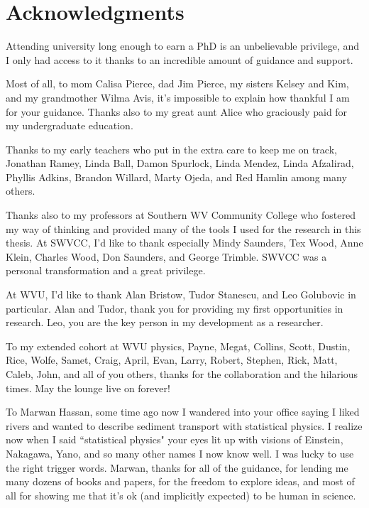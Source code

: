 
\chapter{Acknowledgments}

Attending university long enough to earn a PhD is an unbelievable privilege, and I only had access to it thanks to an incredible amount of guidance and support.

Most of all, to mom Calisa Pierce, dad Jim Pierce, my sisters Kelsey and Kim, and my grandmother Wilma Avis, it's impossible to explain how thankful I am for your guidance. Thanks also to my great aunt Alice who graciously paid for my undergraduate education.

Thanks to my early teachers who put in the extra care to keep me on track, Jonathan Ramey, Linda Ball, Damon Spurlock, Linda Mendez, Linda Afzalirad, Phyllis Adkins, Brandon Willard, Marty Ojeda, and Red Hamlin among many others.
	
Thanks also to my professors at Southern WV Community College who fostered my way of thinking and provided many of the tools I used for the research in this thesis.
At SWVCC, I'd like to thank especially Mindy Saunders, Tex Wood, Anne Klein, Charles Wood, Don Saunders, and George Trimble. SWVCC was a personal transformation and a great privilege. 

At WVU, I'd like to thank Alan Bristow, Tudor Stanescu, and Leo Golubovic in particular. Alan and Tudor, thank you for providing my first opportunities in research. Leo, you are the key person in my development as a researcher.

To my extended cohort at WVU physics, Payne, Megat, Collins, Scott, Dustin, Rice, Wolfe, Samet, Craig, April, Evan, Larry, Robert, Stephen, Rick, Matt, Caleb, John, and all of you others, thanks for the collaboration and the hilarious times. May the lounge live on forever!

To Marwan Hassan, some time ago now I wandered into your office saying I liked rivers and wanted to describe sediment transport with statistical physics. I realize now when I said ``statistical physics" your eyes lit up with visions of Einstein, Nakagawa, Yano, and so many other names I now know well. I was lucky to use the right trigger words.
Marwan, thanks for all of the guidance, for lending me many dozens of books and papers, for the freedom to explore ideas, and most of all for showing me that it's ok (and implicitly expected) to be human in science. 

